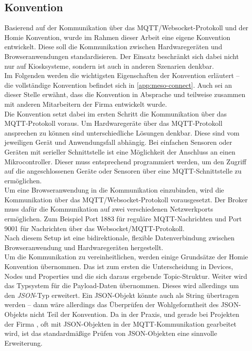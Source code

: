 \subsection{Konvention}
\label{subs:konvention}

Basierend auf der Kommunikation über das MQTT/Websocket-Protokoll und der Homie Konvention,
wurde im Rahmen dieser Arbeit eine eigene Konvention entwickelt. Diese soll die Kommunikation
zwischen Hardwaregeräten und Browseranwendungen standardisieren. Der Einsatz beschränkt
sich dabei nicht nur auf Kiosksysteme, sondern ist auch in anderen Szenarien denkbar.\\
Im Folgenden werden die wichtigsten Eigenschaften der Konvention erläutert -- die vollständige
Konvention befindet sich in \autoref{app:meso-connect}. Auch sei an dieser Stelle erwähnt,
dass die Konvention in Absprache und teilweise zusammen mit anderen Mitarbeitern 
der Firma \meso{} entwickelt wurde.\\

Die Konvention setzt dabei im ersten Schritt die Kommunikation über das MQTT-Protokoll voraus.
Um Hardwaregeräte über das MQTT-Protokoll ansprechen zu können sind unterschiedliche Lösungen 
denkbar. Diese sind vom jeweiligen Gerät und Anwendungsfall abhängig. Bei einfachen Sensoren oder
Geräten mit serieller Schnittstelle ist eine Möglichkeit der Anschluss an einen Mikrocontroller.
Dieser muss entsprechend programmiert werden, um den Zugriff auf die angeschlossenen Geräte 
oder Sensoren über eine MQTT-Schnittstelle zu ermöglichen.\\
Um eine Browseranwendung in die Kommunikation einzubinden, wird die Kommunikation über das 
MQTT/Websocket-Protokoll vorausgesetzt. Der Broker muss dafür die Kommunikation auf zwei verschiedenen 
Netzwerkports ermöglichen. Zum Beispiel Port 1883 für reguläre MQTT-Nachrichten und Port 9001
für Nachrichten über das Websocket/MQTT-Protokoll.\\
Nach diesem Setup ist eine bidirektionale, flexible Datenverbindung zwischen Browseranwendung
und Hardwaregeräten hergestellt.\\

Um die Kommunikation zu vereinheitlichen, werden einige Grundsätze der Homie Konvention übernommen.
Das ist zum ersten die Unterscheidung in Devices, Nodes und Properties und die sich daraus 
ergebende Topic-Struktur. Weiter wird das Typsystem für die Payload-Daten übernommen. 
Dieses wird allerdings um den \emph{JSON}-Typ erweitert. 
Ein JSON-Objekt könnte auch als String übertragen werden -- dann wäre allerdings
das Überprüfen der Wohlgeformtheit des JSON-Objekts nicht Teil der Konvention.
Da in der Praxis, und gerade bei Projekten der Firma \meso{}, oft mit JSON-Objekten in der 
MQTT-Kommunikation gearbeitet wird, ist das standardmäßige Prüfen von JSON-Objekten eine
sinnvolle Erweiterung.

